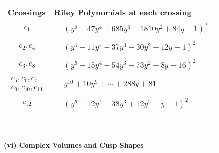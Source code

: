 \documentclass[1p]{elsarticle_modified}
\theoremstyle{definition}
\begin{document}
\begin{tabular}{m{50pt}|m{274pt}}
Crossings & \hspace{64pt}Riley Polynomials at each crossing \\
\hline $$\begin{aligned}c_{1}\end{aligned}$$&$\begin{aligned}
&(y^5-47 y^4+685 y^3-1810 y^2+84 y-1)^2
\end{aligned}$\\
\hline $$\begin{aligned}c_{2},c_{4}\end{aligned}$$&$\begin{aligned}
&(y^5-11 y^4+37 y^3-30 y^2-12 y-1)^2
\end{aligned}$\\
\hline $$\begin{aligned}c_{3},c_{8}\end{aligned}$$&$\begin{aligned}
&(y^5+15 y^4+54 y^3-73 y^2+8 y-16)^2
\end{aligned}$\\
\hline $$\begin{aligned}c_{5},c_{6},c_{7}\\c_{9},c_{10},c_{11}\end{aligned}$$&$\begin{aligned}
&y^{10}+10 y^9+\cdots+288 y+81
\end{aligned}$\\
\hline $$\begin{aligned}c_{12}\end{aligned}$$&$\begin{aligned}
&(y^5+12 y^4+38 y^3+12 y^2+y-1)^2
\end{aligned}$\\
\hline
\end{tabular}\\~\\
\newpage\flushleft \textbf{(vi) Complex Volumes and Cusp Shapes}
\end{document}
